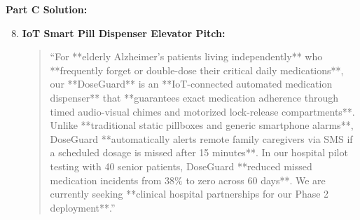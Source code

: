 \begin{solutionbox}
\textbf{Part C Solution:}
\begin{enumerate}[leftmargin=1.2em, itemsep=3pt]
    \setcounter{enumi}{7}
    \item \textbf{IoT Smart Pill Dispenser Elevator Pitch:}
    \begin{quote}
    ``For **elderly Alzheimer's patients living independently** who **frequently forget or double-dose their critical daily medications**, our **DoseGuard** is an **IoT-connected automated medication dispenser** that **guarantees exact medication adherence through timed audio-visual chimes and motorized lock-release compartments**. Unlike **traditional static pillboxes and generic smartphone alarms**, DoseGuard **automatically alerts remote family caregivers via SMS if a scheduled dosage is missed after 15 minutes**. In our hospital pilot testing with 40 senior patients, DoseGuard **reduced missed medication incidents from $38\%$ to zero across 60 days**. We are currently seeking **clinical hospital partnerships for our Phase 2 deployment**.''
    \end{quote}
\end{enumerate}
\end{solutionbox}
